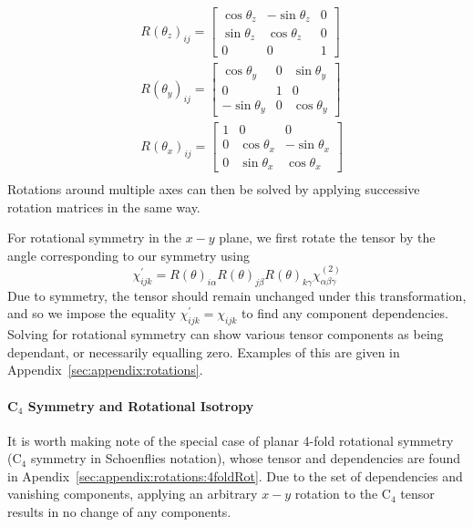 \begin{equation}\label{eq:background:NonlinearOptics:rotation:AllRotationMatrices}
\begin{split}
	&R(\theta_{z})_{ij} =
	\begin{bmatrix}
		\cos{\theta_{z}} & -\sin{\theta_{z}} & 0\\ 
		\sin{\theta_{z}} & \cos{\theta_{z}} & 0\\ 
		0 & 0 & 1
	\end{bmatrix}\\	
	&R(\theta_{y})_{ij} =
	\begin{bmatrix}
		\cos{\theta_{y}} & 0 & \sin{\theta_{y}}\\ 
		0 & 1 & 0\\ 
		-\sin{\theta_{y}} & 0 & \cos{\theta_{y}}
	\end{bmatrix}\\	
	&R(\theta_{x})_{ij} =
	\begin{bmatrix}
		1 & 0 & 0\\ 
		0 & \cos{\theta_{x}} & -\sin{\theta_{x}}\\ 
		0 & \sin{\theta_{x}} & \cos{\theta_{x}}
	\end{bmatrix}\\	
\end{split}
\end{equation}
Rotations around multiple axes can then be solved by applying successive rotation matrices in the same way. 

For rotational symmetry in the $x-y$ plane, we first rotate the tensor by the angle corresponding to our symmetry using
\begin{equation}\label{eq:background:NonlinearOptics:rotation:RotateChi}
	\chi_{ijk}^{\prime} =  R(\theta)_{i\alpha}R(\theta)_{j\beta}R(\theta)_{k\gamma}\chi^{(2)}_{\alpha \beta \gamma}
\end{equation}
Due to symmetry, the tensor should remain unchanged under this transformation, and so we impose the equality $\chi_{ijk}^{\prime}=\chi_{ijk}$ to find any component dependencies. Solving for rotational symmetry can show various tensor components as being dependant, or necessarily equalling zero. Examples of this are given in Appendix~\ref{sec:appendix:rotations}.


\paragraph{C\texorpdfstring{$_4$}{Lg} Symmetry and Rotational Isotropy} \label{sec:appendix:RotIso}
It is worth making note of the special case of planar 4-fold rotational symmetry (C$_4$ symmetry in Schoenflies notation), whose tensor and dependencies are found in Apendix~\ref{sec:appendix:rotations:4foldRot}. Due to the set of dependencies and vanishing components, applying an arbitrary $x-y$ rotation to the C$_4$ tensor results in no change of any components. 

